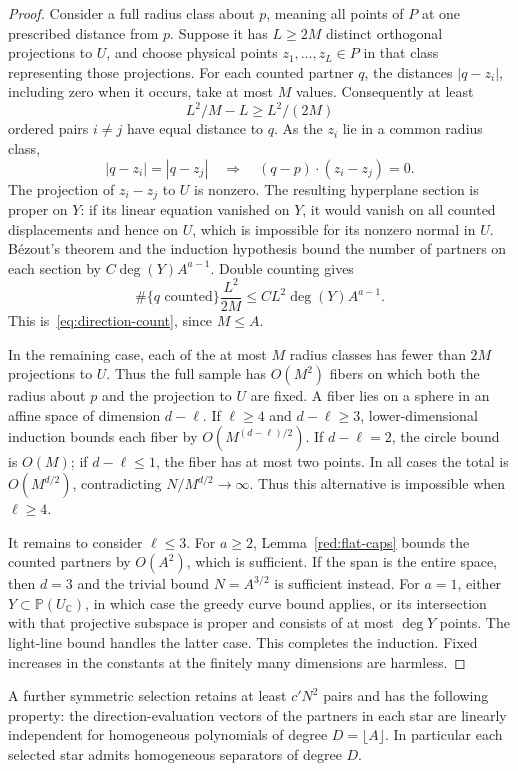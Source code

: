 \begin{proof}
Consider a full radius class about \(p\), meaning all points of \(P\)
at one prescribed distance from \(p\). Suppose it has \(L\ge2M\)
distinct orthogonal projections to \(U\), and choose physical points
\(z_1,\ldots,z_L\in P\) in that class representing those projections.
For each counted partner \(q\), the distances
\(|q-z_i|\), including zero when it occurs, take at most \(M\) values.
Consequently at least
\[
 L^2/M-L\ge L^2/(2M)
\]
ordered pairs \(i\ne j\) have equal distance to \(q\).
As the \(z_i\) lie in a common radius class,
\[
 |q-z_i|=|q-z_j|
 \quad\Longrightarrow\quad
 (q-p)\cdot(z_i-z_j)=0.
\]
The projection of \(z_i-z_j\) to \(U\) is nonzero. The resulting
hyperplane section is proper on \(Y\): if its linear equation vanished
on \(Y\), it would vanish on all counted displacements and hence on
\(U\), which is impossible for its nonzero normal in \(U\).
B\'ezout's theorem and the induction hypothesis bound the number of
partners on each section by \(C\deg(Y)A^{a-1}\). Double counting gives
\[
 \#\{q\text{ counted}\}\frac{L^2}{2M}
 \le C L^2\deg(Y)A^{a-1}.
\]
This is~\eqref{eq:direction-count}, since \(M\le A\).

In the remaining case, each of the at most \(M\) radius classes has
fewer than \(2M\) projections to \(U\). Thus the full sample has
\(O(M^2)\) fibers on which both the radius about \(p\) and the
projection to \(U\) are fixed.
A fiber lies on a sphere in an affine space of dimension \(d-\ell\).
If \(\ell\ge4\) and \(d-\ell\ge3\), lower-dimensional induction bounds
each fiber by \(O(M^{(d-\ell)/2})\). If \(d-\ell=2\), the circle bound
is \(O(M)\); if \(d-\ell\le1\), the fiber has at most two points.
In all cases the total is \(O(M^{d/2})\), contradicting
\(N/M^{d/2}\to\infty\). Thus this alternative is impossible when
\(\ell\ge4\).

It remains to consider \(\ell\le3\).
For \(a\ge2\), Lemma~\ref{red:flat-caps} bounds the counted partners
by \(O(A^2)\), which is sufficient. If the span is the entire space,
then \(d=3\) and the trivial bound \(N=A^{3/2}\) is sufficient instead.
For \(a=1\), either \(Y\subset\mathbb P(U_{\mathbb C})\), in which case
the greedy curve bound applies, or its intersection with that
projective subspace is proper and consists of at most \(\deg Y\)
points. The light-line bound handles the latter case. This completes
the induction. Fixed increases in the constants at the finitely many
dimensions are harmless.
\end{proof}

\begin{proposition}
\label{red:independent-stars}
A further symmetric selection retains at least \(c'N^2\) pairs and
has the following property: the direction-evaluation vectors of the
partners in each star are linearly independent for homogeneous
polynomials of degree \(D=\lfloor A\rfloor\).
In particular each selected star admits homogeneous separators of
degree \(D\).
\end{proposition}

